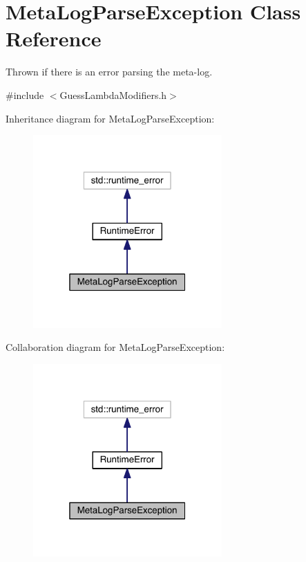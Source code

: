 \hypertarget{class_meta_log_parse_exception}{}\section{Meta\+Log\+Parse\+Exception Class Reference}
\label{class_meta_log_parse_exception}


Thrown if there is an error parsing the meta-\/log.  




{\ttfamily \#include $<$Guess\+Lambda\+Modifiers.\+h$>$}



Inheritance diagram for Meta\+Log\+Parse\+Exception\+:
\nopagebreak
\begin{figure}[H]
\begin{center}
\leavevmode
\includegraphics[width=205pt]{d6/d0c/class_meta_log_parse_exception__inherit__graph}
\end{center}
\end{figure}


Collaboration diagram for Meta\+Log\+Parse\+Exception\+:
\nopagebreak
\begin{figure}[H]
\begin{center}
\leavevmode
\includegraphics[width=205pt]{d2/d37/class_meta_log_parse_exception__coll__graph}
\end{center}
\end{figure}
